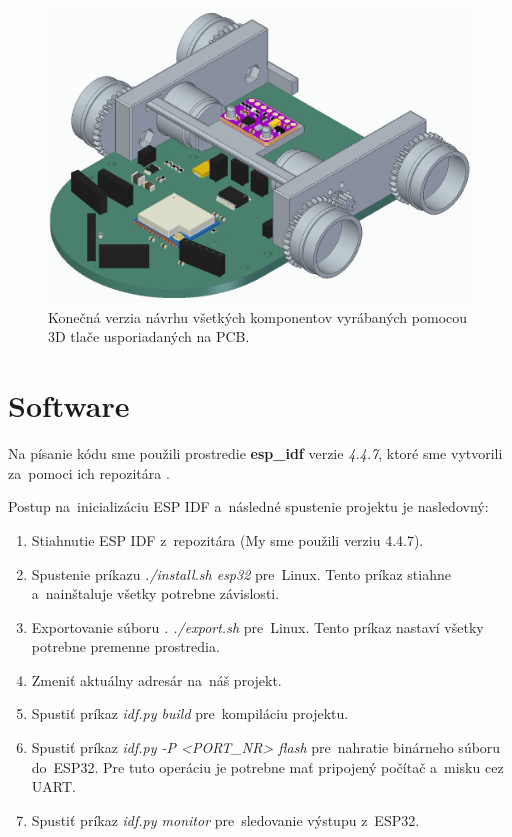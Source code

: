 \begin{figure}[!htpb]
	\centering
	\includegraphics[width=1\linewidth]{includes//images/main_board.jpg}
	\caption{Konečná verzia návrhu všetkých komponentov vyrábaných pomocou 3D tlače usporiadaných na PCB.}
	\label{fig:MainBoard}
\end{figure}

\section{Software}
\label{sec:software}

Na písanie kódu sme použili prostredie \textbf{esp\_idf} verzie \textit{4.4.7}, ktoré sme vytvorili za~pomoci
ich repozitára \cite{espGithub}.

Postup na~inicializáciu ESP IDF a~následné spustenie projektu je nasledovný:
\begin{enumerate}
	\item Stiahnutie ESP IDF z~repozitára \cite{espGithub} (My sme použili verziu 4.4.7).
	\item Spustenie príkazu \textit{./install.sh esp32} pre~Linux.
		Tento príkaz stiahne a~nainštaluje všetky potrebne závislosti.
	\item Exportovanie súboru \textit{. ./export.sh} pre~Linux.
		Tento príkaz nastaví všetky potrebne premenne prostredia.
	\item Zmeniť aktuálny adresár na~náš projekt.
	\item Spustiť príkaz \textit{idf.py build} pre~kompiláciu projektu.
	\item Spustiť príkaz \textit{idf.py -P <PORT\_NR> flash} pre~nahratie binárneho súboru do~ESP32.
		Pre tuto operáciu je potrebne mať pripojený počítač a~misku cez UART.
	\item Spustiť príkaz \textit{idf.py monitor} pre~sledovanie výstupu z~ESP32.
\end{enumerate}

